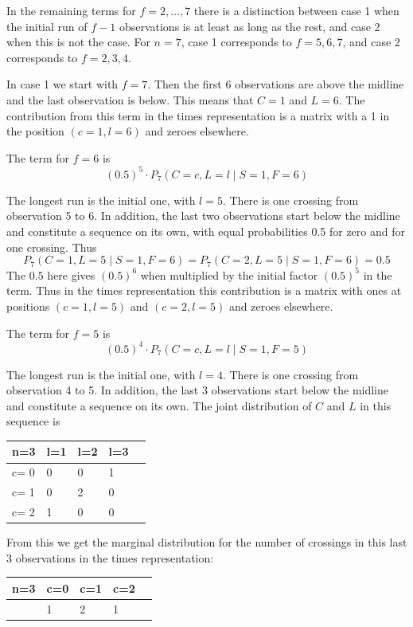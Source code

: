 In the remaining terms for $f=2, \ldots, 7$ there is a distinction between case 1 when the initial run of $f-1$ observations is at least as long as the rest, and case 2 when this is not the case. For $n=7$, case 1 corresponds to $f=5,6,7$, and case 2 corresponds to $f=2,3,4$. 

In case 1 we start with $f=7$. Then the first 6 observations are above the midline and the last observation is below. This means that $C=1$ and $L=6$. The contribution from this term in the times representation is a matrix with a 1 in the position $(c=1,l=6)$ and zeroes elsewhere. 

The term for $f=6$ is $$(0.5)^5 \cdot   P_7 (C=c, L=l \mid S=1,F=6)$$

The longest run is the initial one, with $l=5$. There is one crossing from observation 5 to 6. In addition, the last two observations start below the midline and constitute a sequence on its own, with equal probabilities 0.5 for zero and for one crossing. Thus $$P_7 (C=1, L=5 \mid S=1,F=6)=P_7 (C=2, L=5 \mid S=1,F=6)=0.5$$
The $0.5$ here gives $(0.5)^6$ when multiplied by the initial factor $(0.5)^5$ in the term. Thus in the times representation this contribution is a matrix with ones at positions $(c=1,l=5)$ and $(c=2,l=5)$ and zeroes elsewhere. 

The term for $f=5$ is $$(0.5)^4 \cdot   P_7 (C=c, L=l \mid S=1,F=5)$$

The longest run is the initial one, with $l=4$. There is one crossing from observation 4 to 5. In addition, the last 3 observations start below the midline and constitute a sequence on its own. The joint distribution of $C$ and $L$ in this sequence is 

\begin{tabular}{l | l l l l}
\hline
n=3&l=1&l=2&l=3\\
\hline
c= 0& 0& 0& 1\\
c= 1& 0& 2& 0\\
c= 2& 1& 0& 0\\
\hline
\end{tabular}

From this we get the marginal distribution for the number of crossings in this last 3 observations in the times representation:

\begin{tabular}{l | l l l l}
\hline
n=3&c=0&c=1&c=2\\
\hline
& 1& 2& 1\\
\hline
\end{tabular}


